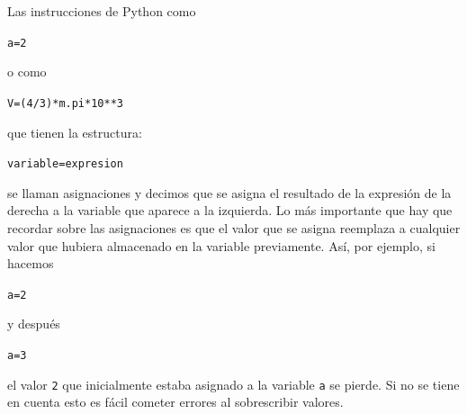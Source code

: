 \documentclass[10pt,a4paper]{article}\usepackage[]{graphicx}\usepackage[]{color}
\makeatletter
\newcommand{\hlnum}[1]{\textcolor[rgb]{0.686,0.059,0.569}{#1}}%
\newcommand{\hlopt}[1]{\textcolor[rgb]{0,0,0}{#1}}%
\newcommand{\hlstd}[1]{\textcolor[rgb]{0.345,0.345,0.345}{#1}}%
\newcommand{\hlkwb}[1]{\textcolor[rgb]{0.69,0.353,0.396}{#1}}%
\newenvironment{kframe}{%
 \def\at@end@of@kframe{}%
 \ifinner\ifhmode%
  \def\at@end@of@kframe{\end{minipage}}%
  \begin{minipage}{\columnwidth}%
 \fi\fi%
 \def\FrameCommand##1{\hskip\@totalleftmargin \hskip-\fboxsep
 \colorbox{shadecolor}{##1}\hskip-\fboxsep
     \hskip-\linewidth \hskip-\@totalleftmargin \hskip\columnwidth}%
 \MakeFramed {\advance\hsize-\width
   \@totalleftmargin\z@ \linewidth\hsize
   \@setminipage}}%
 {\par\unskip\endMakeFramed%
 \at@end@of@kframe}
\newenvironment{knitrout}{}{} %
\makeatother
\begin{document}
Las instrucciones de Python como
\begin{knitrout}
\color{fgcolor}\begin{kframe}
\begin{alltt}
\hlstd{a} \hlkwb{=} \hlnum{2}
\end{alltt}
\end{kframe}
\end{knitrout}
o como
\begin{knitrout}
\color{fgcolor}\begin{kframe}
\begin{alltt}
\hlstd{V} \hlkwb{=} \hlstd{(}\hlnum{4} \hlopt{/} \hlnum{3}\hlstd{)} \hlopt{*} \hlstd{m.pi} \hlopt{*} \hlnum{10}\hlopt{**}\hlnum{3}
\end{alltt}
\end{kframe}
\end{knitrout}
que tienen la estructura:
\begin{knitrout}
\color{fgcolor}\begin{kframe}
\begin{alltt}
\hlstd{variable} \hlkwb{=} \hlstd{expresion}
\end{alltt}
\end{kframe}
\end{knitrout}
se llaman {\sf asignaciones} y decimos que se asigna el resultado de la expresión de la derecha a la variable que aparece a la izquierda. Lo más importante que hay que recordar sobre las asignaciones es que el valor que se asigna reemplaza a cualquier valor que hubiera almacenado en la variable previamente. Así, por ejemplo, si hacemos
\begin{knitrout}
\color{fgcolor}\begin{kframe}
\begin{alltt}
\hlstd{a} \hlkwb{=} \hlnum{2}
\end{alltt}
\end{kframe}
\end{knitrout}
y después
\begin{knitrout}
\color{fgcolor}\begin{kframe}
\begin{alltt}
\hlstd{a} \hlkwb{=} \hlnum{3}
\end{alltt}
\end{kframe}
\end{knitrout}
el valor {\tt 2} que inicialmente estaba asignado a la variable {\tt a} se pierde. Si no se tiene en cuenta esto es fácil cometer errores al sobrescribir valores.
\end{document}
